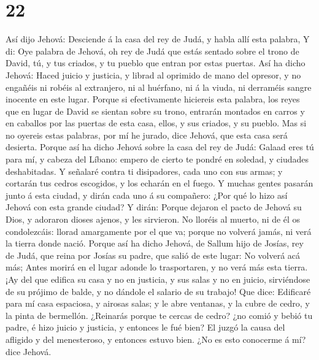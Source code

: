 \hypertarget{section-21}{%
\section{22}\label{section-21}}

 Así dijo Jehová: Desciende á la casa del rey de Judá, y
habla allí esta palabra,  Y di: Oye palabra de Jehová, oh
rey de Judá que estás sentado sobre el trono de David, tú, y tus
criados, y tu pueblo que entran por estas puertas.  Así ha
dicho Jehová: Haced juicio y justicia, y librad al oprimido de mano del
opresor, y no engañéis ni robéis al extranjero, ni al huérfano, ni á la
viuda, ni derraméis sangre inocente en este lugar.  Porque
si efectivamente hiciereis esta palabra, los reyes que en lugar de David
se sientan sobre su trono, entrarán montados en carros y en caballos por
las puertas de esta casa, ellos, y sus criados, y su pueblo.
 Mas si no oyereis estas palabras, por mí he jurado, dice
Jehová, que esta casa será desierta.  Porque así ha dicho
Jehová sobre la casa del rey de Judá: Galaad eres tú para mí, y cabeza
del Líbano: empero de cierto te pondré en soledad, y ciudades
deshabitadas.  Y señalaré contra ti disipadores, cada uno
con sus armas; y cortarán tus cedros escogidos, y los echarán en el
fuego.  Y muchas gentes pasarán junto á esta ciudad, y
dirán cada uno á su compañero: ¿Por qué lo hizo así Jehová con esta
grande ciudad?  Y dirán: Porque dejaron el pacto de Jehová
su Dios, y adoraron dioses ajenos, y les sirvieron.  No
lloréis al muerto, ni de él os condolezcáis: llorad amargamente por el
que va; porque no volverá jamás, ni verá la tierra donde nació.
 Porque así ha dicho Jehová, de Sallum hijo de Josías,
rey de Judá, que reina por Josías su padre, que salió de este lugar: No
volverá acá más;  Antes morirá en el lugar adonde lo
trasportaren, y no verá más esta tierra.  ¡Ay del que
edifica su casa y no en justicia, y sus salas y no en juicio,
sirviéndose de su prójimo de balde, y no dándole el salario de su
trabajo!  Que dice: Edificaré para mí casa espaciosa, y
airosas salas; y le abre ventanas, y la cubre de cedro, y la pinta de
bermellón.  ¿Reinarás porque te cercas de cedro? ¿no
comió y bebió tu padre, é hizo juicio y justicia, y entonces le fué
bien?  El juzgó la causa del afligido y del menesteroso,
y entonces estuvo bien. ¿No es esto conocerme á mí? dice Jehová.
